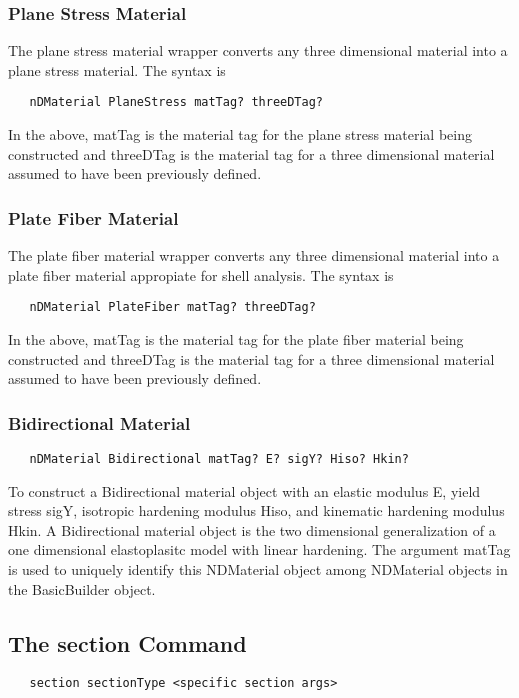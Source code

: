 \documentclass[12pt]{article}
\begin{document}
\subsubsection{Plane Stress Material}
The plane stress material wrapper converts any three dimensional 
material into a plane stress material.
The syntax is
{\sf\small
\begin{verbatim}
   nDMaterial PlaneStress matTag? threeDTag? 
\end{verbatim}
}
In the above, matTag is the material tag for the plane stress material 
being constructed and threeDTag is the material tag for a three 
dimensional material assumed to have been previously defined.


\subsubsection{Plate Fiber Material}
The plate fiber material wrapper converts any three dimensional 
material into a plate fiber material appropiate for shell analysis.
The syntax is
{\sf\small
\begin{verbatim}
   nDMaterial PlateFiber matTag? threeDTag? 
\end{verbatim}
}
In the above, matTag is the material tag for the plate fiber material 
being constructed and threeDTag is the material tag for a three 
dimensional material assumed to have been previously defined.


\subsubsection{Bidirectional Material}
{\sf\small
\begin{verbatim}
   nDMaterial Bidirectional matTag? E? sigY? Hiso? Hkin?
\end{verbatim}
}

To construct a Bidirectional material object with an elastic modulus
E, yield stress sigY, isotropic hardening modulus Hiso, and kinematic
hardening modulus Hkin. A Bidirectional material object is the two
dimensional generalization of a one dimensional elastoplasitc model
with linear hardening.
The argument matTag is used to
uniquely identify this NDMaterial object among NDMaterial objects
in the BasicBuilder object.

\subsection{The section Command}
{\sf\small
\begin{verbatim}
   section sectionType <specific section args>
\end{verbatim}
}
\end{document}
